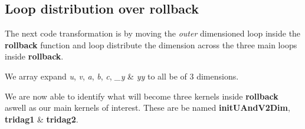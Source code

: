 \subsection{Loop distribution over rollback}
The next code transformation is by moving the \emph{outer} dimensioned loop
inside the \textbf{rollback} function and loop distribute the dimension across
the three main loops inside \textbf{rollback}.

We array expand \emph{u}, \emph{v}, \emph{a}, \emph{b}, \emph{c}, \emph{\_y} \& \emph{yy} to all be of 3 dimensions.

We are now able to identify what will become three kernels inside
\textbf{rollback} aswell as our main kernels of interest. These are be named
\textbf{initUAndV2Dim}, \textbf{tridag1} \& \textbf{tridag2}.
